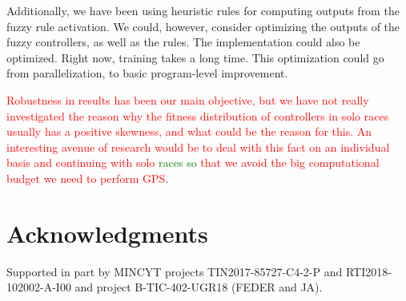 \documentclass[10pt,journal,compsoc]{IEEEtran}
\begin{document}
Additionally, we have been using heuristic rules for computing outputs
from the fuzzy rule activation. We could, however, consider optimizing
the outputs of the fuzzy controllers, as well as the rules. The implementation could also be optimized. Right now, training takes
a long time. This optimization could go from parallelization, to basic
program-level improvement.

\textcolor{red}{Robustness in results has been our main objective, but
  we have not really investigated the reason why the fitness
  distribution of controllers in solo races usually has a positive
  skewness, and what could be the reason for this. An interesting
  avenue of research would be to deal with this fact on an individual
  basis and continuing with solo \textcolor{green}{races so} that we avoid the big   computational budget we need to perform GPS}.

\section*{Acknowledgments}

Supported in part by MINCYT projects
TIN2017-85727-C4-2-P and  RTI2018-102002-A-I00 and project
B-TIC-402-UGR18 (FEDER and JA).












\end{document}
